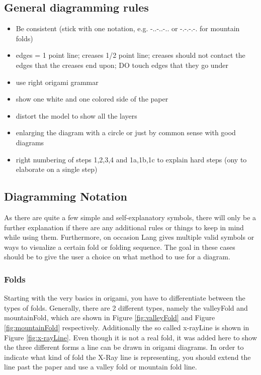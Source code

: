 \subsection{General diagramming rules}
\label{sec:generalRules}

\begin{itemize}
	\item Be consistent (stick with one notation, e.g. -..-..-.. or -.-.-.-. for mountain folds)
	\item edges = 1 point line; creases 1/2 point line; creases should not contact the edges that the creases end upon; DO touch edges that they go under
	\item use right origami grammar
	\item show one white and one colored side of the paper
	\item distort the model to show all the layers
	\item enlarging the diagram with a circle or just by common sense with good diagrams
	\item right numbering of steps 1,2,3,4 and 1a,1b,1c to explain hard steps (ony to elaborate on a single step)
\end{itemize}

\newpage
\subsection{Diagramming Notation}
\label{sec:notation}

As there are quite a few simple and self-explanatory symbols, there will only be a further explanation if there are any additional rules or things to keep in mind while using them. Furthermore, on occasion Lang gives multiple valid symbols or ways to visualize a certain fold or folding sequence. The goal in these cases should be to give the user a choice on what method to use for a diagram. 

\subsubsection{Folds}
\label{sec:folds}

Starting with the very basics in origami, you have to differentiate between the types of folds. Generally, there are 2 different types, namely the \gls{valleyFold} and \gls{mountainFold}, which are shown in Figure \ref{fig:valleyFold} and Figure \ref{fig:mountainFold} respectively. Additionally the so called \gls{x-rayLine} is shown in Figure \ref{fig:x-rayLine}. Even though it is not a real fold, it was added here to show the three different forms a line can be drawn in origami diagrams. In order to indicate what kind of fold the X-Ray line is representing, you should extend the line past the paper and use a valley fold or mountain fold line.

